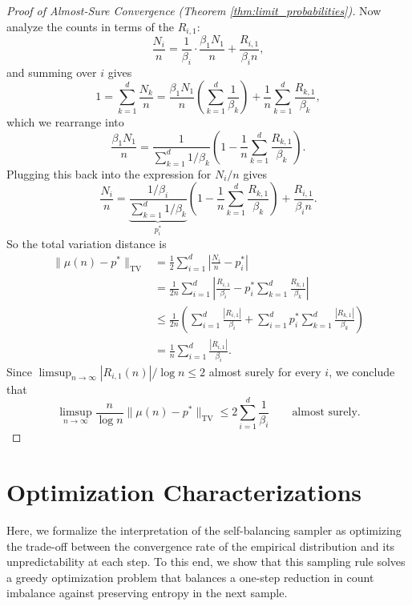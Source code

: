 \begin{proof}[Proof of Almost-Sure Convergence (Theorem \ref{thm:limit_probabilities})]
    Now analyze the counts in terms of the $R_{i,1}$:
    $$\frac{N_i}{n} = \frac{1}{\beta_i} \cdot \frac{\beta_1 N_1}{n} + \frac{R_{i,1}}{\beta_i n},$$
    and summing over $i$ gives
    $$1 = \sum_{k=1}^d \frac{N_k}{n} = \frac{\beta_1 N_1}{n} \left( \sum_{k=1}^d \frac{1}{\beta_k} \right) + \frac{1}{n} \sum_{k=1}^d \frac{R_{k,1}}{\beta_k},$$
    which we rearrange into
    $$\frac{\beta_1 N_1}{n} = \frac{1}{\sum_{k=1}^d 1/\beta_k} \left(1 - \frac{1}{n} \sum_{k=1}^d \frac{R_{k,1}}{\beta_k} \right).$$
    Plugging this back into the expression for $N_i/n$ gives
    $$\frac{N_i}{n} = \underbrace{\frac{1/\beta_i}{\sum_{k=1}^d 1/\beta_k}}_{p_i^*} \left(1 - \frac{1}{n} \sum_{k=1}^d \frac{R_{k,1}}{\beta_k} \right) + \frac{R_{i,1}}{\beta_i n}.$$
    So the total variation distance is
    \begin{align*}
        \| \mu(n) - p^* \|_{\operatorname{TV}} &= \frac{1}{2} \sum_{i=1}^d \left| \frac{N_i}{n} - p_i^* \right| \\
        &= \frac{1}{2n} \sum_{i=1}^d \left| \frac{R_{i,1}}{\beta_i} - p_i^*\sum_{k=1}^d \frac{R_{k,1}}{\beta_k} \right| \\
        &\leq \frac{1}{2n}\left(\sum_{i=1}^d\frac{|R_{i,1}|}{\beta_i}
        +\sum_{i=1}^d p_i^*\sum_{k=1}^d\frac{|R_{k,1}|}{\beta_k}\right) \\
        &= \frac{1}{n}\sum_{i=1}^d\frac{|R_{i,1}|}{\beta_i}.
    \end{align*}
    Since $\limsup_{n\to\infty}|R_{i,1}(n)|/\log n\leq 2$ almost surely for every $i$, we conclude that
    \[
        \limsup_{n\to\infty}\frac{n}{\log n}\|\mu(n)-p^*\|_{\operatorname{TV}}
        \leq 2\sum_{i=1}^d\frac{1}{\beta_i}
        \qquad\text{almost surely}.
    \]
\end{proof}


\section{Optimization Characterizations}

\label{sec:optimization_problem}

Here, we formalize the interpretation of the self-balancing sampler as optimizing the trade-off between
the convergence rate of the empirical distribution and its unpredictability at each step.
 To this end, we show that this sampling rule solves a greedy optimization problem that balances a one-step reduction
 in count imbalance against preserving entropy in the next sample.

